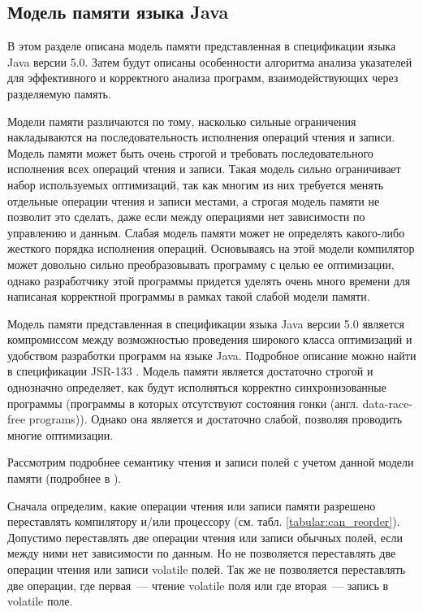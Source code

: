 \documentclass[14pt,titlepage]{extarticle}
\newcommand{\eng}[1]{{\English#1}}
\begin{document}
    \subsection{Модель памяти языка Java}

      В этом разделе описана модель памяти представленная в спецификации языка
      Java версии 5.0.
      Затем будут описаны особенности алгоритма анализа указателей для
      эффективного и корректного анализа программ, взаимодействующих через
      разделяемую память.

      Модели памяти различаются по тому, насколько сильные ограничения
      накладываются на последовательность исполнения операций чтения и
      записи.
      Модель памяти может быть очень строгой и требовать
      последовательного исполнения всех операций чтения и записи.
      Такая модель сильно ограничивает набор используемых оптимизаций,
      так как многим из них требуется менять отдельные операции чтения и
      записи местами, а строгая модель памяти не позволит это сделать, даже
      если между операциями нет зависимости по управлению и данным.
      Слабая модель памяти может не определять какого-либо жесткого порядка
      исполнения операций. Основываясь на этой модели компилятор может
      довольно сильно преобразовывать программу с целью ее оптимизации,
      однако разработчику этой программы придется уделять очень много времени
      для написаная корректной программы в рамках такой слабой модели памяти.

      Модель памяти представленная в спецификации языка Java версии 5.0
      является компромиссом между возможностью проведения широкого класса
      оптимизаций и удобством разработки программ на языке Java. Подробное
      описание можно найти в спецификации JSR-133 \cite{jsr133}. Модель памяти
      является достаточно строгой и однозначно определяет, как будут
      исполняться корректно синхронизованные программы (программы в которых
      отсутствуют состояния гонки (англ. \eng{data-race-free programs})).
      Однако она является и достаточно слабой, позволяя проводить многие
      оптимизации.

      Рассмотрим подробнее семантику чтения и записи полей с учетом данной
      модели памяти (подробнее в \cite{jsr133_cookbook}).

      Сначала определим, какие операции чтения или записи памяти разрешено
      переставлять компилятору и/или процессору (см. табл.
      \ref{tabular:can_reorder}).
      Допустимо переставлять две операции чтения или записи обычных полей, если
      между ними нет зависимости по данным. Но не позволяется переставлять две
      операции чтения или записи \eng{volatile} полей. Так же не позволяется
      переставлять две операции, где первая~--- чтение \eng{volatile} поля или
      где вторая~--- запись в \eng{volatile} поле.
\end{document}
